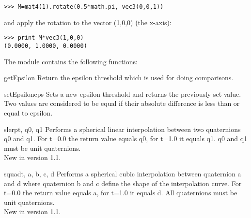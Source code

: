 \begin{verbatim}
>>> M=mat4(1).rotate(0.5*math.pi, vec3(0,0,1))
\end{verbatim}

and apply the rotation to the vector (1,0,0) (the x-axis):

\begin{verbatim}
>>> print M*vec3(1,0,0)
(0.0000, 1.0000, 0.0000)
\end{verbatim}

The module contains the following functions:

\begin{funcdesc}{getEpsilon}{}
Return the epsilon threshold which is used for doing comparisons.
\end{funcdesc}

\begin{funcdesc}{setEpsilon}{eps}
Sets a new epsilon threshold and returns the previously set value. Two
values are considered to be equal if their absolute difference is less
than or equal to epsilon.
\end{funcdesc}

\begin{funcdesc}{slerp}{t, q0, q1}
Performs a spherical linear interpolation between two quaternions q0
and q1. For t=0.0 the return value equals q0, for t=1.0 it equals
q1. q0 and q1 must be unit quaternions. \\
New in version 1.1.
\end{funcdesc}

\begin{funcdesc}{squad}{t, a, b, c, d}
Performs a spherical cubic interpolation between quaternion a and d
where quaternion b and c define the shape of the interpolation
curve. For t=0.0 the return value equals a, for t=1.0 it equals d. All
quaternions must be unit quaternions. \\
New in version 1.1.
\end{funcdesc}










